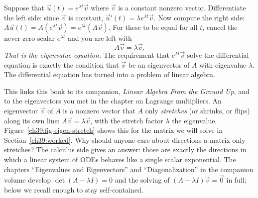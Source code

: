 \begin{walkbox}
Suppose that $\vec u(t) = e^{\lambda t}\vec v$ where $\vec v$ is a
constant nonzero vector. Differentiate the left side: since $\vec v$ is constant,
$\vec u'(t) = \lambda e^{\lambda t}\vec v$. Now compute the right side:
$A\vec u(t) = A(e^{\lambda t}\vec v) = e^{\lambda t}(A\vec v)$. For these to be
equal for all $t$, cancel the never-zero scalar $e^{\lambda t}$ and you are left
with
\[
  A\vec v = \lambda\vec v.
\]
\emph{That is the eigenvalue equation.} The requirement that $e^{\lambda t}\vec v$ solve
the differential equation is exactly the condition that $\vec v$ be an eigenvector of
$A$ with eigenvalue $\lambda$. The differential equation has turned into a problem of linear algebra.
\end{walkbox}

\begin{connectionbox}
This links this book to its companion, \emph{Linear Algebra From
the Ground Up}, and to the eigenvectors you met in the chapter on Lagrange
multipliers. An eigenvector $\vec v$ of $A$ is a nonzero vector
that $A$ only \emph{stretches} (or shrinks, or flips) along its own line: $A\vec v =
\lambda\vec v$, with the stretch factor $\lambda$ the eigenvalue.
Figure~\ref{ch39:fig-eigen-stretch} shows this for the matrix we will solve in
Section~\ref{ch39:worked}. Why should anyone care about
directions a matrix only stretches? The calculus side gives an answer:
those are exactly the directions in which a linear system of
ODEs behaves like a single scalar exponential. The chapters ``Eigenvalues and
Eigenvectors'' and ``Diagonalization'' in the companion volume develop
$\det(A-\lambda I)=0$ and the solving of $(A-\lambda I)\vec v = \vec 0$ in
full; below we recall enough to stay self-contained.
\end{connectionbox}

